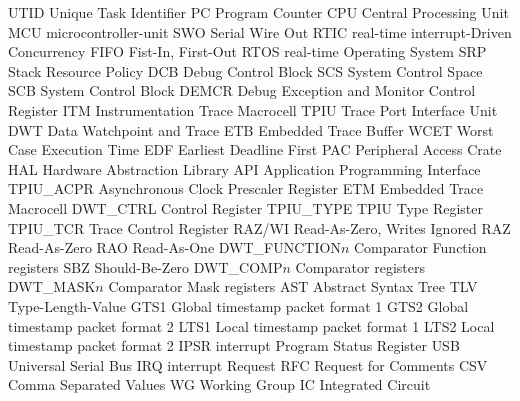  {UTID} {{Unique Task Identifier}}
 {PC} {{Program Counter}}
 {CPU} {{Central Processing Unit}}
 {MCU} {{\Gls{microcontroller-unit}}}
 {SWO} {{Serial Wire Out}}
 {RTIC} {{\Gls{real-time} \Gls{interrupt}-Driven Concurrency}}
 {FIFO} {{Fist-In, First-Out}}
 {RTOS} {{\Gls{real-time} Operating System}}
 {SRP} {{Stack Resource Policy}}
 {DCB} {{Debug Control Block}}
 {SCS} {{System Control Space}}
 {SCB} {{System Control Block}}
 {DEMCR} {{Debug Exception and Monitor Control Register}}
 {ITM} {{Instrumentation Trace Macrocell}}
 {TPIU} {{Trace Port Interface Unit}}
 {DWT} {{Data Watchpoint and Trace}}
 {ETB} {{Embedded Trace Buffer}}
 {WCET} {{Worst Case Execution Time}}
 {EDF} {{Earliest Deadline First}}
 {PAC} {{Peripheral Access Crate}}
 {HAL} {{Hardware Abstraction Library}}
 {API} {{Application Programming Interface}}
 {TPIU\_ACPR} {{Asynchronous Clock Prescaler Register}}
 {ETM} {{Embedded Trace Macrocell}}
 {DWT\_CTRL} {{Control Register}}
 {TPIU\_TYPE} {{TPIU Type Register}}
 {TPIU\_TCR} {{Trace Control Register}}
 {RAZ/WI} {{Read-As-Zero, Writes Ignored}}
 {RAZ} {{Read-As-Zero}}
 {RAO} {{Read-As-One}}
 {DWT\_FUNCTION$n$} {{Comparator Function registers}}
 {SBZ} {{Should-Be-Zero}}
 {DWT\_COMP$n$} {{Comparator registers}}
 {DWT\_MASK$n$} {{Comparator Mask registers}}
 {AST} {{Abstract Syntax Tree}}
 {TLV} {{Type-Length-Value}}
 {GTS1} {{Global timestamp packet format 1}}
 {GTS2} {{Global timestamp packet format 2}}
 {LTS1} {{Local timestamp packet format 1}}
 {LTS2} {{Local timestamp packet format 2}}
 {IPSR} {{\Gls{interrupt} Program Status Register}}
 {USB} {{Universal Serial Bus}}
 {IRQ} {{\Gls{interrupt} Request}}
 {RFC} {{Request for Comments}}
 {CSV} {{Comma Separated Values}}
 {WG} {{Working Group}}
 {IC} {{Integrated Circuit}}


